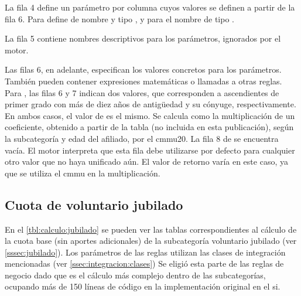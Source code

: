


La fila 4 define un parámetro por columna cuyos valores se definen a partir de la fila 6.
Para  define de nombre  y tipo , y para  el nombre  de tipo .

La fila 5 contiene nombres descriptivos para los parámetros, ignorados por el motor.

Las filas 6, en adelante, especifican los valores concretos para los parámetros.
También pueden contener expresiones matemáticas o llamadas a otras reglas.
%
Para , las filas 6 y 7 indican dos valores, que corresponden a ascendientes de primer grado con más de diez años de antigüedad y su cónyuge, respectivamente.
En ambos casos, el valor de  es el mismo.
Se calcula como la multiplicación de un coeficiente, obtenido a partir de la tabla  (no incluida en esta publicación), según la subcategoría y edad del afiliado, por el \acrshort{cmmu20}.
%
La fila 8 de  se encuentra vacía.
El motor interpreta que esta fila debe utilizarse por defecto para cualquier otro valor que no haya unificado aún.
El valor de retorno varía en este caso, ya que se utiliza el \acrshort{cmmu} en la multiplicación.

\subsection{Cuota de voluntario jubilado}

En el \cref{tbl:calculo:jubilado} se pueden ver las tablas correspondientes al cálculo de la cuota base (sin aportes adicionales) de la subcategoría voluntario jubilado (ver \cref{sssec:jubilado}). Los parámetros de las reglas utilizan las clases de integración mencionadas (ver \cref{ssec:integracion:clases}) Se eligió esta parte de las reglas de negocio dado que es el cálculo más complejo dentro de las subcategorías, ocupando más de 150 líneas de código en la implementación original en el \acrshort{si}.

